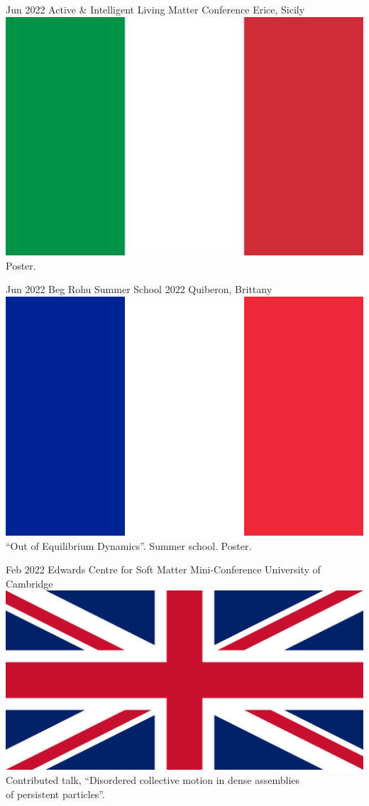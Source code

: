 \documentclass[a4paper]{cvtemplate_en} %
\begin{document}
\begin{cvbody}
\cvitem
	{Jun 2022}
	{}
	{Active \& Intelligent Living Matter Conference}
	{Erice, Sicily \includegraphics[height=0.8\myheight]{it}}
	{}{}{}
	{}
	{Poster.\\}

\cvitem
	{Jun 2022}
	{}
	{Beg Rohu Summer School 2022}
	{Quiberon, Brittany \includegraphics[height=0.8\myheight]{fr}}
	{}{}{}
	{}
	{``Out of Equilibrium Dynamics''. Summer school. Poster.\\}

\cvitem
	{Feb 2022}
	{}
	{Edwards Centre for Soft Matter Mini-Conference}
	{University of Cambridge \includegraphics[height=0.8\myheight]{uk}}
	{}{}{}
	{}
	{Contributed talk, ``Disordered collective motion in dense assemblies\\ of persistent particles''.\\}


\end{cvbody}
\end{document}
